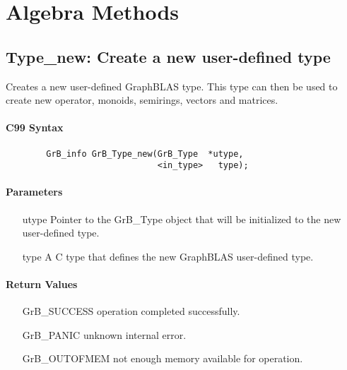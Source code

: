 \section{Algebra Methods}
\label{Sec:AlgebraMethods}



\subsection{{\sf Type\_new}: Create a new user-defined type}

Creates a new user-defined GraphBLAS type. This type can then be used to create new
operator, monoids, semirings, vectors and matrices.

\paragraph{C99 Syntax}

\begin{verbatim}
        GrB_info GrB_Type_new(GrB_Type	*utype,
                              <in_type>	  type);
\end{verbatim}

\paragraph{Parameters}

\begin{itemize}[leftmargin=1.1in]
	\item[{\sf utype}] 	Pointer to the {\sf GrB\_Type} object that will be initialized to the new user-defined type.
	\item[{\sf type}]	A C type that defines the new GraphBLAS user-defined type.
\end{itemize}

\paragraph{Return Values}

\begin{itemize}[leftmargin=2.1in]
\item[{\sf GrB\_SUCCESS}]           operation completed successfully.
\item[{\sf GrB\_PANIC}]             unknown internal error.
\item[{\sf GrB\_OUTOFMEM}]          not enough memory available for operation.
\end{itemize}

